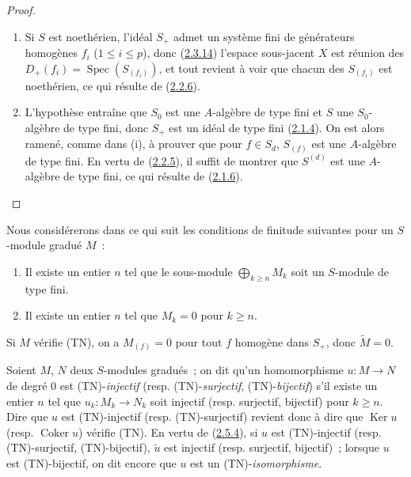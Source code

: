 \begin{proof}
\begin{enumerate}
  \item[\rm(i)] Si $S$ est noethérien, l'idéal $S_+$ admet un système fini de
    générateurs homogènes $f_i$ ($1\leq i\leq p$), donc
    (\hyperref[II.2.3.14-fr]{2.3.14}) l'espace sous-jacent $X$ est réunion des
    $D_+(f_i)=\operatorname{Spec}(S_{(f_i)})$, et tout revient à voir que
    chacun des $S_{(f_i)}$ est noethérien, ce qui résulte de
    (\hyperref[II.2.2.6-fr]{2.2.6}).
  \item[\rm(ii)] L'hypothèse entraîne que $S_0$ est une $A$-algèbre de type
    fini et $S$ une $S_0$-algèbre de type fini, donc $S_+$ est un idéal de
    type fini (\hyperref[II.2.1.4-fr]{2.1.4}). On est alors ramené, comme dans
    (i), à prouver que pour $f\in S_d$, $S_{(f)}$ est une $A$-algèbre de type
    fini. En vertu de (\hyperref[II.2.2.5-fr]{2.2.5}), il suffit de montrer
    que $S^{(d)}$ est une $A$-algèbre de type fini, ce qui résulte de
    (\hyperref[II.2.1.6-fr]{2.1.6}).
\end{enumerate}
\end{proof}

\begin{env}[2.7.2]
\label{II.2.7.2-fr}
Nous considérerons dans ce qui suit les conditions de finitude suivantes pour
un $S$-module gradué $M$~:
\begin{enumerate}
  \item[\rm(TF)] Il existe un entier $n$ tel que le sous-module
    $\bigoplus_{k\geq n}M_k$ soit un $S$-module de type fini.
  \item[\rm(TN)] Il existe un entier $n$ tel que $M_k=0$ pour $k\geq n$.
\end{enumerate}

Si $M$ vérifie (TN), on a $M_{(f)}=0$ pour tout $f$ homogène dans $S_+$,
donc $\widetilde{M}=0$.

Soient $M$, $N$ deux $S$-modules gradués~; on dit qu'un homomorphisme
$u:M\to N$ de degré $0$ est (TN)-\emph{injectif} (resp.
(TN)-\emph{surjectif}, (TN)-\emph{bijectif}) s'il existe un entier $n$ tel
que $u_k:M_k\to N_k$ soit injectif (resp. surjectif, bijectif) pour
$k\geq n$. Dire que $u$ est (TN)-injectif (resp. (TN)-surjectif) revient donc
à dire que $\operatorname{Ker}u$ (resp. $\operatorname{Coker}u$) vérifie
(TN). En vertu de (\hyperref[II.2.5.4-fr]{2.5.4}), si $u$ est (TN)-injectif
(resp. (TN)-surjectif, (TN)-bijectif), $\widetilde{u}$ est injectif (resp.
surjectif, bijectif)~; lorsque $u$ est (TN)-bijectif, on dit encore que $u$
est un (TN)-\emph{isomorphisme}.
\end{env}

